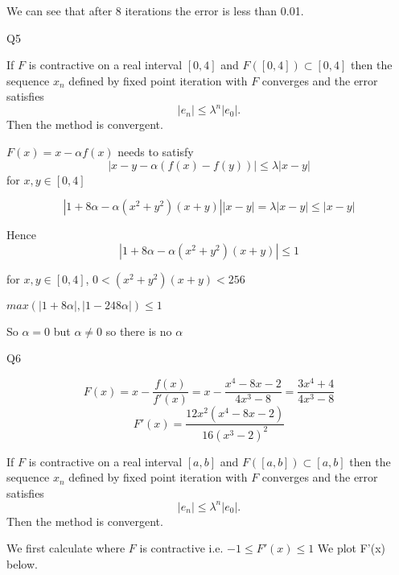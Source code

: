 \documentclass[11pt]{article}
\begin{document}
    We can see that after 8 iterations the error is less than 0.01.

    Q5

If \(F\) is contractive on a real interval \([0,4]\) and
\(F([0,4]) \subset [0,4]\) then the sequence \(x_n\) defined by fixed
point iteration with \(F\) converges and the error satisfies
\[|e_n| \leq \lambda^n |e_0|.\] Then the method is convergent.

\(F(x) = x - \alpha f(x)\) needs to satisfy
\[|x-y-\alpha(f(x)-f(y))| \leq \lambda |x-y| \]for \(x,y \in [0, 4]\)

\[|1+8\alpha-\alpha(x^2+y^2)(x+y)||x-y|=\lambda |x-y|\leq|x-y|\]

Hence \[|1+8\alpha-\alpha(x^2+y^2)(x+y)|\leq1\]

for \(x,y \in [0, 4]\), \(0<(x^2+y^2)(x+y)<256\)

\(max(|1+8\alpha|,|1-248\alpha|)\leq1\)

So \(\alpha=0\) but \(\alpha\neq0\) so there is no \(\alpha\)

    Q6

\[F(x)=x-\frac{f(x)}{f'(x)}=x-\frac{x^4-8x-2}{4x^3-8}=\frac{3x^4+4}{4x^3-8}\]
\[F'(x)=\frac{12x^2(x^4-8x-2)}{16(x^3-2)^2}\]

If \(F\) is contractive on a real interval \([a,b]\) and
\(F([a,b]) \subset [a,b]\) then the sequence \(x_n\) defined by fixed
point iteration with \(F\) converges and the error satisfies
\[|e_n| \leq \lambda^n |e_0|.\] Then the method is convergent.

    We first calculate where \(F\) is contractive i.e.
\(-1\leq F'(x)\leq 1\) We plot F'(x) below.
\end{document}
